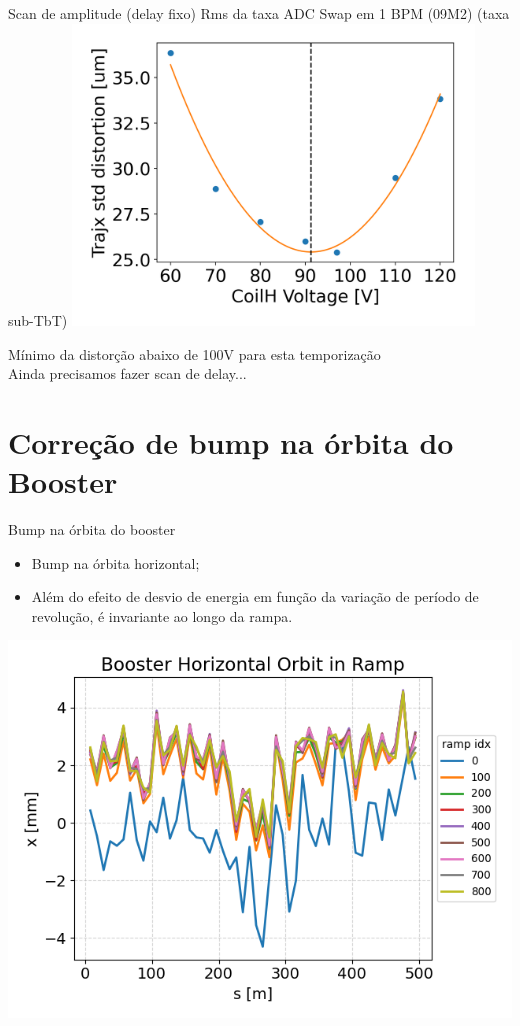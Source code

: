 \documentclass[1610]{beamer}					  %
\begin{document}
\begin{frame}{Scan de amplitude (delay fixo)}
\centering
    Rms da taxa ADC Swap em 1 BPM (09M2) (taxa sub-TbT)
    \includegraphics[width=0.8\textwidth]{2024-04-19/figures/voltage_scan_adcrate.png}

    Mínimo da distorção abaixo de 100V para esta temporização \\
    Ainda precisamos fazer scan de delay...
\end{frame}



\section{Correção de bump na órbita do Booster}

\begin{frame}{Bump na órbita do booster}
\vspace{0.5cm}
\begin{itemize}
    \item Bump na órbita horizontal;
    \item Além do efeito de desvio de energia em função da variação de período de revolução, é invariante ao longo da rampa.
\vspace{0.5cm}
\end{itemize}
\centering
    \includegraphics[scale=0.5]{2024-04-19/figures/bo-orbit.png}
\end{frame}
\end{document}
